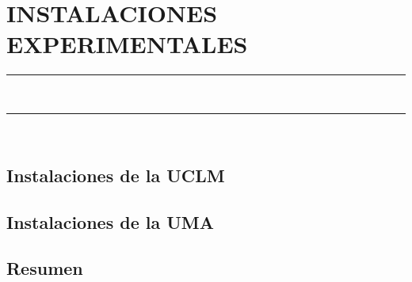 \pagestyle{plain}
\chapter{INSTALACIONES EXPERIMENTALES}\label{cap:InstalacionesExperimentales}
\vspace{0.2cm}
\noindent\rule{\linewidth}{1.5pt}\\
\startcontents[chapters]
\vspace{0.2cm}
\noindent\rule{\linewidth}{1.3pt}\\
\newpage
\section{Instalaciones de la UCLM}\label{sec:InstalacionesUCLM}
\section{Instalaciones de la UMA}\label{sec:InstalacionesUMA}
\section{Resumen}
\newpage
		

